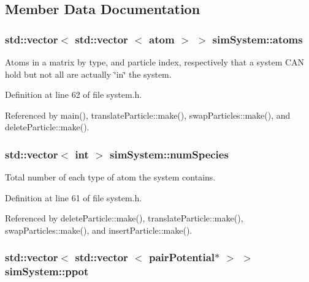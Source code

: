 \subsection{Member Data Documentation}
\hypertarget{classsim_system_a90421b19082f7fb8fc23b7264b1161e4}{}
\subsubsection[{atoms}]{\setlength{\rightskip}{0pt plus 5cm}std\+::vector$<$ std\+::vector $<$ {\bf atom} $>$ $>$ sim\+System\+::atoms}\label{classsim_system_a90421b19082f7fb8fc23b7264b1161e4}


Atoms in a matrix by type, and particle index, respectively that a system C\+A\+N hold but not all are actually \char`\"{}in\char`\"{} the system. 



Definition at line 62 of file system.\+h.



Referenced by main(), translate\+Particle\+::make(), swap\+Particles\+::make(), and delete\+Particle\+::make().

\hypertarget{classsim_system_a9eea865e6dc1cff377b1e79c4d9c23f0}{}
\subsubsection[{num\+Species}]{\setlength{\rightskip}{0pt plus 5cm}std\+::vector$<$ int $>$ sim\+System\+::num\+Species}\label{classsim_system_a9eea865e6dc1cff377b1e79c4d9c23f0}


Total number of each type of atom the system contains. 



Definition at line 61 of file system.\+h.



Referenced by delete\+Particle\+::make(), translate\+Particle\+::make(), swap\+Particles\+::make(), and insert\+Particle\+::make().

\hypertarget{classsim_system_a8d6271751a62f61edcf57f773540a4a3}{}
\subsubsection[{ppot}]{\setlength{\rightskip}{0pt plus 5cm}std\+::vector$<$ std\+::vector $<$ {\bf pair\+Potential}$\ast$ $>$ $>$ sim\+System\+::ppot}\label{classsim_system_a8d6271751a62f61edcf57f773540a4a3}


